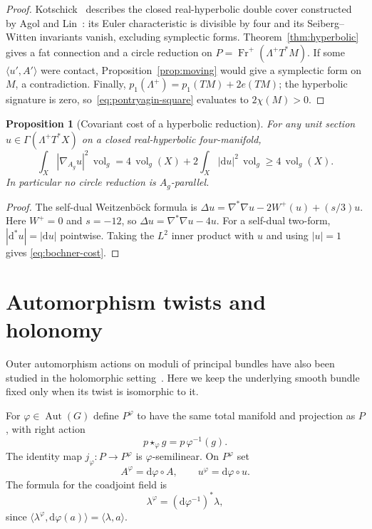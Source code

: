 \documentclass[11pt]{amsart}
\newcommand{\Fr}{\operatorname{Fr}}
\newcommand{\vol}{\operatorname{vol}}
\newcommand{\dd}{\mathrm d}
\theoremstyle{plain}
\newtheorem{proposition}[theorem]{Proposition}
\theoremstyle{definition}
\theoremstyle{remark}
\begin{document}
\begin{proof}
Kotschick~\cite[Example~16]{Kotschick} describes the closed
real-hyperbolic double cover constructed by Agol and Lin~\cite{AgolLin}:
its Euler characteristic is divisible by four and its
Seiberg--Witten invariants vanish, excluding symplectic forms.
Theorem~\ref{thm:hyperbolic} gives a fat connection and a circle
reduction on $P=\Fr^+(\Lambda^+T^*M)$.  If some
$\langle u',A'\rangle$ were contact, Proposition~\ref{prop:moving}
would give a symplectic form on $M$, a contradiction.  Finally,
$p_1(\Lambda^+)=p_1(TM)+2e(TM)$; the hyperbolic signature is zero,
so~\eqref{eq:pontryagin-square} evaluates to $2\chi(M)>0$.
\end{proof}

\begin{proposition}[Covariant cost of a hyperbolic reduction]
For any unit section $u\in\Gamma(\Lambda^+T^*X)$ on a closed
real-hyperbolic four-manifold,
\begin{equation}\label{eq:bochner-cost}
 \int_X|\nabla_{A_g}u|^2\,\vol_g
 =4\,\vol_g(X)+2\int_X|\dd u|^2\,\vol_g
 \geq 4\,\vol_g(X).
\end{equation}
In particular no circle reduction is $A_g$-parallel.
\end{proposition}

\begin{proof}
The self-dual Weitzenb\"ock formula is
$\Delta u=\nabla^*\nabla u-2W^+(u)+(s/3)u$.
Here $W^+=0$ and $s=-12$, so
$\Delta u=\nabla^*\nabla u-4u$.
For a self-dual two-form, $|\dd^*u|=|\dd u|$ pointwise.
Taking the $L^2$ inner product with $u$ and using $|u|=1$ gives
\eqref{eq:bochner-cost}.
\end{proof}

\appendix

\section{Automorphism twists and holonomy}\label{sec:twist}

Outer automorphism actions on moduli of principal bundles have also been studied in the holomorphic setting~\cite{AntonSancho}.  Here we keep the underlying smooth bundle fixed only when its twist is isomorphic to it.

For $\varphi\in\operatorname{Aut}(G)$ define $P^\varphi$ to have the same total manifold and projection as $P$, with right action
\[
 p\mathbin{\star_\varphi}g=p\,\varphi^{-1}(g).
\]
The identity map $j_\varphi:P\to P^\varphi$ is $\varphi$-semilinear.  On $P^\varphi$ set
\begin{equation}\label{eq:twistdata}
 A^\varphi=\dd\varphi\circ A,
 \qquad u^\varphi=\dd\varphi\circ u.
\end{equation}
The formula for the coadjoint field is
\[
 \lambda^\varphi=(\dd\varphi^{-1})^*\lambda,
\]
since $\langle\lambda^\varphi,\dd\varphi(a)\rangle=\langle\lambda,a\rangle$.
\end{document}
